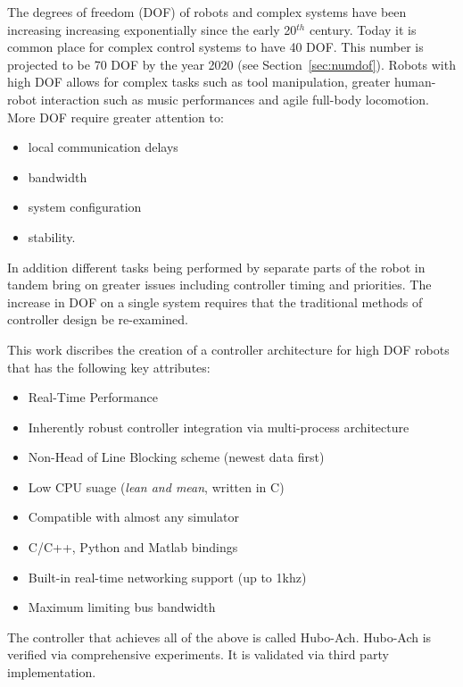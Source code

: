 The degrees of freedom (DOF) of robots and complex systems have been increasing increasing exponentially since the early 20$^{th}$ century.
Today it is common place for complex control systems to have 40 DOF. 
This number is projected to be 70 DOF by the year 2020 (see Section~\ref{sec:numdof}).
Robots with high DOF allows for complex tasks such as tool manipulation\cite{lofaroRAM2013,lofaroTePRA2013HuboAch,lofaroTePRA2013Valve,gtechIK}, greater human-robot interaction such as music performances\cite{lofaroEURASIP2011, 6094987,lofaroIASTED2011,5686847} and agile full-body locomotion\cite{lofaroHumanoids2012,lofaroGamesRobot,tepraLadder2013}.
More DOF require greater attention to:
\begin{itemize}
\item local communication delays
\item bandwidth
\item system configuration
\item stability.
\end{itemize}
In addition different tasks being performed by separate parts of the robot in tandem bring on greater issues including controller timing and priorities.
The increase in DOF on a single system requires that the traditional methods of controller design be re-examined.

This work discribes the creation of a controller architecture for high DOF robots that has the following key attributes: 
\begin{itemize}
\item Real-Time Performance
\item Inherently robust controller integration via multi-process architecture 
\item Non-Head of Line Blocking scheme (newest data first)
\item Low CPU suage (\textit{lean and mean}, written in C)
\item Compatible with almost any simulator
\item C/C++, Python and Matlab bindings
\item Built-in real-time networking support (up to 1khz)
\item Maximum limiting bus bandwidth
\end{itemize}

The controller that achieves all of the above is called Hubo-Ach. 
Hubo-Ach is verified via comprehensive experiments.
It is validated via third party implementation. 



